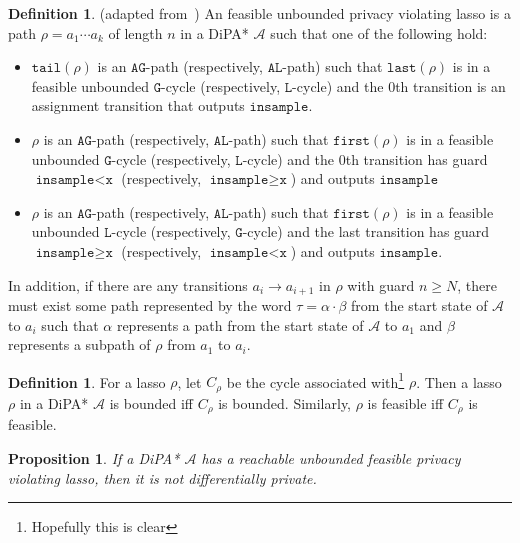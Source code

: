 \documentclass[12pt]{article}
\newcommand{\gguard}{\texttt{insample}\geq \texttt{x}}
\newcommand{\lguard}{\texttt{insample} < \texttt{x}}
\newtheorem{prop}[thm]{Proposition}
\theoremstyle{definition}
\newtheorem{defn}[thm]{Definition}
\begin{document}
\begin{defn} (adapted from~\cite{chadhaLinearTimeDecidability2021})
	An feasible unbounded privacy violating lasso is a path $\rho = a_1\cdots a_k$ of length $n$ in a DiPA* $\mathcal{A}$ such that one of the following hold:

	\begin{itemize}
		\item $\texttt{tail}(\rho)$ is an $\texttt{AG}$-path (respectively, $\texttt{AL}$-path) such that $\texttt{last}(\rho)$ is in a feasible unbounded $\texttt{G}$-cycle (respectively, $\texttt{L}$-cycle) and the 0th transition is an assignment transition that outputs $\texttt{insample}$.
		\item $\rho$ is an $\texttt{AG}$-path (respectively, $\texttt{AL}$-path) such that $\texttt{first}(\rho)$ is in a feasible unbounded $\texttt{G}$-cycle (respectively, $\texttt{L}$-cycle) and the 0th transition has guard $\lguard$ (respectively, $\gguard$) and outputs $\texttt{insample}$ 
		\item $\rho$ is an $\texttt{AG}$-path (respectively, $\texttt{AL}$-path) such that $\texttt{first}(\rho)$ is in a feasible unbounded $\texttt{L}$-cycle (respectively, $\texttt{G}$-cycle) and the last transition has guard $\gguard$ (respectively, $\lguard$) and outputs $\texttt{insample}$.
	\end{itemize}

	In addition, if there are any transitions $a_i\to a_{i+1}$ in $\rho$ with guard $n\geq N$, there must exist some path represented by the word $\tau = \alpha \cdot \beta$ from the start state of $\mathcal{A}$ to $a_i$ such that $\alpha$ represents a path from the start state of $\mathcal{A}$ to $a_1$ and $\beta$ represents a subpath of $\rho$ from $a_1$ to $a_i$.

\end{defn}

\begin{defn}
For a lasso $\rho$, let $C_\rho$ be the cycle associated with\footnote{Hopefully this is clear} $\rho$. Then a lasso $\rho$ in a DiPA* $\mathcal{A}$ is bounded iff $C_\rho$ is bounded. Similarly, $\rho$ is feasible iff $C_\rho$ is feasible.
\end{defn}

\begin{prop}
	If a DiPA* $\mathcal{A}$ has a reachable unbounded feasible privacy violating lasso, then it is not differentially private.
\end{prop}
\end{document}
